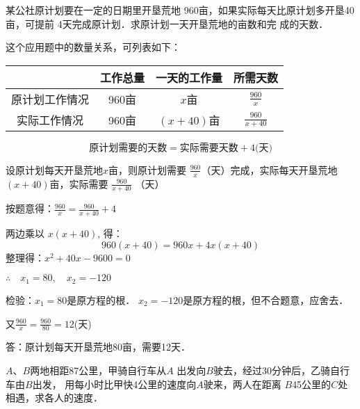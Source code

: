 \begin{example}
    某公社原计划要在一定的日期里开垦荒地
960亩，如果实际每天比原计划多开垦40亩，可提前
4天完成原计划．求原计划一天开垦荒地的亩数和完
成的天数．
\end{example}

\begin{analyze}
    这个应用题中的数量关系，可列表如下：
\begin{center}
    \begin{tabular}{cccc}
        \hline
    &    工作总量&一天的工作量&所需天数\\
    \hline
原计划工作情况&960亩& $x$亩  & $\tfrac{960}{x}$\\
实际工作情况&960亩&$(x+40)$亩 & $\tfrac{960}{x+40}$\\
\hline
    \end{tabular}
\end{center}
\[\text{原计划需要的天数}=\text{实际需要天数}+4\text{(天)}\]
\end{analyze}


\begin{solution}
    设原计划每天开垦荒地$x$亩，则原计划需要
    $\frac{960}{x}$（天）完成，实际每天开垦荒地$(x+40)$亩，实际需要
   $\frac{960}{x+40}$
    （天）
    
    按题意得：$\frac{960}{x}=\frac{960}{x+40}+4$
    
    两边乘以
    $x(x+40)$, 得：
    \[960(x+40)=960x+4x(x+40)\]
    整理得：$x^2+40x-9600=0$

    $\therefore\quad x_1=80,\quad x_2=-120$
    
    检验：$x_1=80$是原方程的根．    $x_2=-120$是原方程的根，但不合题意，应舍去．

    又$\frac{960}{x}=\frac{960}{80}=12$(天)

    答：原计划每天开垦荒地80亩，需要12天．
\end{solution}


\begin{example}
    $A$、$B$两地相距87公里，甲骑自行车从$A$
出发向$B$驶去，经过30分钟后，乙骑自行车由$B$出发，
用每小时比甲快4公里的速度向$A$驶来，两人在距离
$B$45公里的$C$处相遇，求各人的速度．
\end{example}

